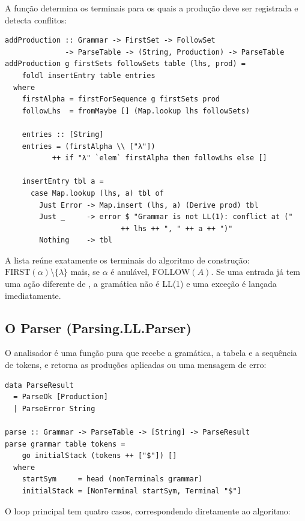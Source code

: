 A função  determina os
terminais para os quais a produção deve ser registrada
e detecta conflitos:

\begin{verbatim}
addProduction :: Grammar -> FirstSet -> FollowSet
              -> ParseTable -> (String, Production) -> ParseTable
addProduction g firstSets followSets table (lhs, prod) =
    foldl insertEntry table entries
  where
    firstAlpha = firstForSequence g firstSets prod
    followLhs  = fromMaybe [] (Map.lookup lhs followSets)

    entries :: [String]
    entries = (firstAlpha \\ ["λ"])
           ++ if "λ" `elem` firstAlpha then followLhs else []

    insertEntry tbl a =
      case Map.lookup (lhs, a) tbl of
        Just Error -> Map.insert (lhs, a) (Derive prod) tbl
        Just _     -> error $ "Grammar is not LL(1): conflict at ("
                           ++ lhs ++ ", " ++ a ++ ")"
        Nothing    -> tbl
\end{verbatim}

A lista  reúne exatamente os
terminais do algoritmo de construção: \(\mathrm{FIRST}(\alpha)
\setminus \{\lambda\}\) mais, se \(\alpha\) é anulável,
\(\mathrm{FOLLOW}(A)\). Se uma entrada já tem uma ação diferente de
, a gramática não é LL(1) e uma
exceção é lançada imediatamente.

\subsection{O Parser (Parsing.LL.Parser)}

O analisador é uma função pura que recebe a gramática, a tabela e a
sequência de tokens, e retorna as produções aplicadas ou uma
mensagem de erro:

\begin{verbatim}
data ParseResult
  = ParseOk [Production]
  | ParseError String

parse :: Grammar -> ParseTable -> [String] -> ParseResult
parse grammar table tokens =
    go initialStack (tokens ++ ["$"]) []
  where
    startSym     = head (nonTerminals grammar)
    initialStack = [NonTerminal startSym, Terminal "$"]
\end{verbatim}

O loop principal tem quatro casos, correspondendo diretamente ao algoritmo:

